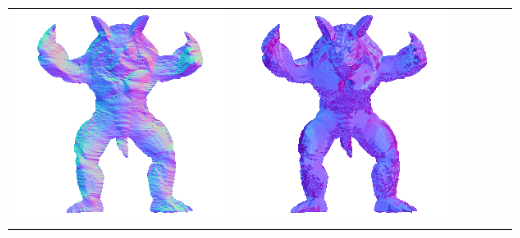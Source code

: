 \begin{center}
\begin{tabularx}{\linewidth}{@{}Y@{}Y@{}Y@{}Y@{}Y@{}Y@{}}
\includegraphics[width=\linewidth]{semisynthetic/20160617_22_yu_out.png} &
\includegraphics[width=\linewidth]{semisynthetic/20160617_22_dpsn_out.png} &

\end{tabularx}
\end{center}
